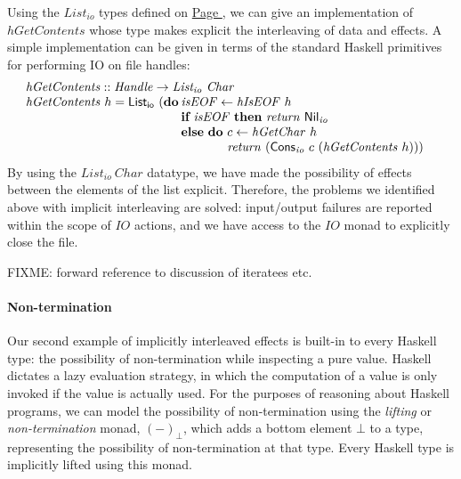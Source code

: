 \documentclass{jfp1}
\newcommand{\kw}[1]{\textbf{#1}}
\begin{document}
Using the $\mathit{List_{io}}$ types defined on
\hyperref[defn:listio]{Page \pageref*{defn:listio}}, we can give an
implementation of $\mathit{hGetContents}$ whose type makes explicit
the interleaving of data and effects. A simple implementation can be
given in terms of the standard Haskell primitives for performing IO on
file handles:
\begin{displaymath}
  \begin{array}{l}
  \mathit{hGetContents} :: \mathit{Handle} \to \mathit{List_{io}}~\mathit{Char} \\
  \begin{array}{@{}l@{\hspace{0.2em}}l}
    \mathit{hGetContents}~h = \mathsf{List_{io}}~(\kw{do} & \mathit{isEOF} \leftarrow \mathit{hIsEOF}~h \\
    & \kw{if}~\mathit{isEOF}~\kw{then}~\mathit{return}~\mathsf{Nil}_{\mathit{io}} \\
    & \kw{else}~\kw{do}~
    \begin{array}[t]{@{}l}
      c \leftarrow \mathit{hGetChar}~h \\
      \mathit{return}~(\mathsf{Cons}_{\mathit{io}}~c~(\mathit{hGetContents}~h)))
    \end{array}
  \end{array}
\end{array}
\end{displaymath}
By using the $\mathit{List_{io}}~\mathit{Char}$ datatype, we
have made the possibility of effects between the elements of the list
explicit. Therefore, the problems we identified above with implicit
interleaving are solved: input/output failures are reported within the
scope of $\mathit{IO}$ actions, and we have access to the
$\mathit{IO}$ monad to explicitly close the file.

FIXME: forward reference to discussion of iteratees etc.

\paragraph{Non-termination} Our second example of implicitly
interleaved effects is built-in to every Haskell type: the possibility
of non-termination while inspecting a pure value. Haskell dictates a
lazy evaluation strategy, in which the computation of a value is only
invoked if the value is actually used. For the purposes of reasoning
about Haskell programs, we can model the possibility of
non-termination using the \emph{lifting} or \emph{non-termination}
monad, $(-)_\bot$, which adds a bottom element $\bot$ to a type,
representing the possibility of non-termination at that type. Every
Haskell type is implicitly lifted using this monad.
\end{document}
